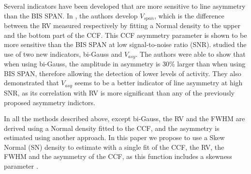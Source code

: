 \documentclass{aa}
\begin{document}
Several indicators have been developed that are more sensitive to line asymmetry than the BIS SPAN. In \citet{Boisse-2011}, the authors develop $V_{span}$, which is the difference between the RV measured respectively by fitting a Normal density to the upper and the bottom part of the CCF. This CCF asymmetry parameter is shown to be more sensitive than the BIS SPAN at low signal-to-noise ratio (SNR).
%
\citet{Figueira-2013} studied the use of two new indicators, bi-Gauss and $V_{asy}$. The authors were able to show that when using bi-Gauss, the amplitude in asymmetry is 30\% larger than when using BIS SPAN, therefore allowing the detection of lower levels of activity. They also demonstrated that $V_{asy}$ seems to be a better indicator of line asymmetry at high SNR, as its correlation with RV is more significant than any of the previously proposed asymmetry indictors.

In all the methods described above, except bi-Gauss, the RV and the FWHM are derived using a Normal density fitted to the CCF, and the asymmetry is estimated using another approach. 
%
In this paper we propose to use a Skew Normal (SN) density to estimate with a single fit of the CCF, the RV, the FWHM and the asymmetry of the CCF, as this function includes a skewness parameter \citep[][]{Azzalini1985}. 

\end{document}
